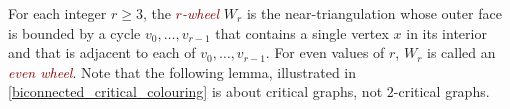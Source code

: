 \documentclass[12pt]{article}
\newtheorem{lem}{Lemma}
\DeclareMathOperator{\corners}{\Gamma}
\newcommand{\defin}[1]{\emph{\textcolor{Maroon}{#1}}}
\theoremstyle{definition}
\begin{document}
%
%
%
%

For each integer $r\ge 3$, the \defin{$r$-wheel} $W_r$ is the near-triangulation whose outer face is bounded by a cycle $v_0,\ldots,v_{r-1}$ that contains a single vertex $x$ in its interior and that is adjacent to each of $v_0,\ldots,v_{r-1}$.  For even values of $r$, $W_r$ is called an \defin{even wheel}. Note that the following lemma, illustrated in \cref{biconnected_critical_colouring} is about critical graphs, not $2$-critical graphs.
\end{document}
